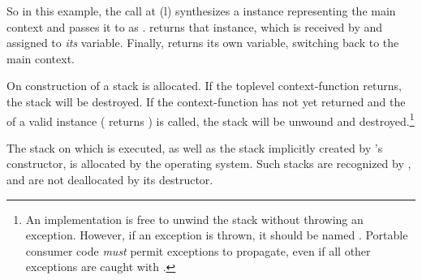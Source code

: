 So in this example, the call at (l) synthesizes a \ectx instance representing
the main context and passes it to  as .  returns
that  instance, which is received by  and assigned
to \emph{its}  variable. Finally,  returns its
own  variable, switching back to the main context.


\label{subsec:destruction}
On construction of  a stack is allocated. If the
toplevel context-function returns, the stack will be destroyed. If the
context-function has not yet returned and the  of
a valid  instance (\opbool
returns ) is called, the stack will be unwound and
destroyed.\footnote{An implementation is free to unwind the stack without
throwing an exception. However, if an exception is thrown, it should be
named . Portable consumer
code \emph{must} permit  exceptions to
propagate, even if all other exceptions are caught with .}

The stack on which  is executed, as well as the stack implicitly
created by 's constructor, is allocated by the operating
system. Such stacks are recognized by \ectx, and are not deallocated by its
destructor.

